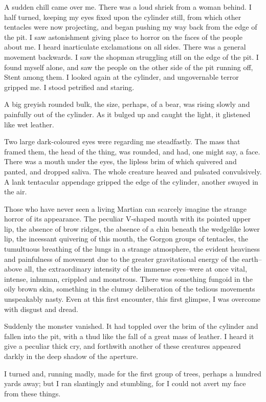 A sudden chill came over me. There was a loud shriek from a woman
behind. I half turned, keeping my eyes fixed upon the cylinder
still, from which other tentacles were now projecting, and began
pushing my way back from the edge of the pit. I saw astonishment
giving place to horror on the faces of the people about me. I heard
inarticulate exclamations on all sides. There was a general
movement backwards. I saw the shopman struggling still on the edge
of the pit. I found myself alone, and saw the people on the other
side of the pit running off, Stent among them. I looked again at
the cylinder, and ungovernable terror gripped me. I stood petrified
and staring.

A big greyish rounded bulk, the size, perhaps, of a bear, was
rising slowly and painfully out of the cylinder. As it bulged up
and caught the light, it glistened like wet leather.

Two large dark-coloured eyes were regarding me steadfastly. The
mass that framed them, the head of the thing, was rounded, and had,
one might say, a face. There was a mouth under the eyes, the
lipless brim of which quivered and panted, and dropped saliva. The
whole creature heaved and pulsated convulsively. A lank tentacular
appendage gripped the edge of the cylinder, another swayed in the
air.

Those who have never seen a living Martian can scarcely imagine the
strange horror of its appearance. The peculiar V-shaped mouth with
its pointed upper lip, the absence of brow ridges, the absence of a
chin beneath the wedgelike lower lip, the incessant quivering of
this mouth, the Gorgon groups of tentacles, the tumultuous
breathing of the lungs in a strange atmosphere, the evident
heaviness and painfulness of movement due to the greater
gravitational energy of the earth--above all, the extraordinary
intensity of the immense eyes--were at once vital, intense,
inhuman, crippled and monstrous. There was something fungoid in the
oily brown skin, something in the clumsy deliberation of the
tedious movements unspeakably nasty. Even at this first encounter,
this first glimpse, I was overcome with disgust and dread.

Suddenly the monster vanished. It had toppled over the brim of the
cylinder and fallen into the pit, with a thud like the fall of a
great mass of leather. I heard it give a peculiar thick cry, and
forthwith another of these creatures appeared darkly in the deep
shadow of the aperture.

I turned and, running madly, made for the first group of trees,
perhaps a hundred yards away; but I ran slantingly and stumbling,
for I could not avert my face from these things.

